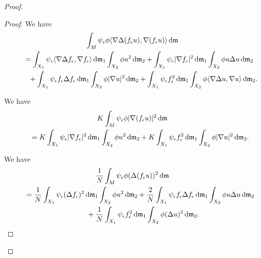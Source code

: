 \documentclass[10pt,a4paper]{amsart}
\numberwithin{equation}{section}
\theoremstyle{definition}
\newcommand{\mf}{\mathfrak{m}}
\begin{document}
\begin{proof}
\begin{proof}
We have
\begin{gather}
\int_M \psi_\epsilon \phi\langle\nabla \Delta(f_\epsilon u),\nabla(f_\epsilon u) \rangle\,{\rm d}\mf
\nonumber
\\ \qquad
=\int_{X_1}\psi_\epsilon\langle\nabla \Delta f_\epsilon,\nabla f_\epsilon\rangle\,{\rm d}\mf_1\int_{X_2}\phi u^2\,{\rm d}\mf_2
+\int_{X_1} \psi_\epsilon |\nabla f_\epsilon|^2\,{\rm d}\mf_1\int_{X_2}\phi u\Delta u\,{\rm d}\mf_2
\nonumber
\\  \qquad\quad
{}+\int_{X_1} \psi_\epsilon f_\epsilon \Delta f_\epsilon\,{\rm d}\mf_1\int_{X_2}\phi|\nabla u|^2\,{\rm d}\mf_2
+\int_{X_1} \psi_\epsilon f_\epsilon^2\,{\rm d}\mf_1\int_{X_2}\phi\langle\nabla \Delta u,\nabla u\rangle\,{\rm d}\mf_2.
\label{3c}
\end{gather}

We have
\begin{gather}
K\int_M \psi_\epsilon \phi|\nabla (f_\epsilon u)|^2\,{\rm d}\mf\nonumber
\\ \qquad
{}=K \int_{X_1}\psi_\epsilon|\nabla f_\epsilon|^2\,{\rm d}\mf_1\int_{X_2}\phi u^2\,{\rm d}\mf_2
+K\int_{X_1} \psi_\epsilon f_\epsilon^2\,{\rm d}\mf_1\int_{X_2}\phi |\nabla u|^2\,{\rm d}\mf_2.
\label{3d}
\end{gather}


We have
\begin{gather}
\frac{1}{N}\int_M \psi_\epsilon \phi(\Delta (f_\epsilon u))^2\,{\rm d}\mf
\nonumber
\\ \qquad
{}=\frac{1}{N}\int_{X_1}\psi_\epsilon(\Delta f_\epsilon)^2\,{\rm d}\mf_1\int_{X_2}\phi u^2\,{\rm d}\mf_2
+\frac{2}{N}\int_{X_1} \psi_\epsilon f_\epsilon \Delta f_\epsilon\,{\rm d}\mf_1\int_{X_2}\phi u \Delta u\,{\rm d}\mf_2
\nonumber
\\ \qquad\quad
{}+\frac{1}{N}\int_{X_1} \psi_\epsilon f_\epsilon^2\,{\rm d}\mf_1\int_{X_2}\phi (\Delta u)^2\,{\rm d}\mf_2.
\label{3e}
\end{gather}


\end{proof}
\end{proof}
\end{document}
